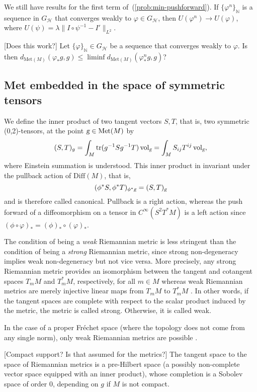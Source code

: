 \documentclass{article}
\theoremstyle{plain}
\theoremstyle{definition}
\numberwithin{equation}{section}
\newcommand{\N}{\ensuremath{\mathbb{N}}}
\newcommand{\g}{\ensuremath{\textsl{g}}}
\newcommand{\Diff}{\ensuremath{\mathrm{Diff}}}
\newcommand{\Met}{\ensuremath{\mathrm{Met}}}
\newcommand{\Vol}{\ensuremath{\mathrm{vol}}}
\newcommand{\tr}{\ensuremath{\mathrm{tr}}}
\begin{document}
We still have results for the first term of~(\ref{prob:min-pushforward}). If $\{\varphi^n\}_\N$ is a sequence in $G_\mathcal{H}$ that converges weakly to $\varphi\in G_\mathcal{H}$, then $U(\varphi^n)\to U(\varphi)$, where $U(\psi)=\lambda\|I\circ\psi^{-1}-I'\|_{L^2}$.

[Does this work?] Let $\{\varphi\}_\N\in G_\mathcal{H}$ be a sequence that converges weakly to $\varphi$. Is then $d_{\mathrm{Met}(M)}(\varphi_*g,g)\leq \liminf d_{\mathrm{Met}(M)}(\varphi^n_*g,g)$?


\subsection[Met embedded]{Met embedded in the space of symmetric tensors}
We define the inner product of two tangent vectors $S,T$, that is, two symmetric (0,2)-tensors, at the point $\g\in\Met(M)$ by
\[
(S,T)_g=\int_M \tr(g^{-1}Sg^{-1}T)\,\Vol_\g = \int_M S_{ij}T^{ij}\,\Vol_\g,
\]
where Einstein summation is understood. This inner product in invariant under the pullback action of $\Diff(M)$, that is,
\[
(\phi^*S,\phi^*T)_{\phi^*\g}=(S,T)_\g
\]
and is therefore called canonical. Pullback is a right action, whereas the push forward of a diffeomorphism on a tensor in $C^\infty(S^2T^*M)$ is a left action since $(\phi\circ\varphi)_*=(\phi)_*\circ(\varphi)_*$. 

The condition of being a \textit{weak} Riemannian metric is less stringent than the condition of being a \textit{strong} Riemannian metric, since strong non-degeneracy implies weak non-degeneracy but not vice versa. More precisely, any strong Riemannian metric provides an isomorphism between the tangent and cotangent spaces $T_mM$ and $T_m^*M$, respectively, for all $m\in M$ whereas weak Riemannian metrics are merely injective linear maps from $T_mM$ to $T_m^*M$ \cite{abraham2002}. In other words, if the tangent spaces are complete with respect to the scalar product induced by the metric, the metric is called strong. Otherwise, it is called weak.  

In the case of a proper Fréchet space (where the topology does not come from any single norm), only weak Riemannian metrics are possible \cite{clarke2009metric}.

[Compact support? Is that assumed for the metrics?]
The tangent space to the space of Riemannian metrics is a pre-Hilbert space (a possibly non-complete vector space equipped with an inner product), whose completion is a Sobolev space of order $0$, depending on $g$ if $M$ is not compact.
\end{document}
